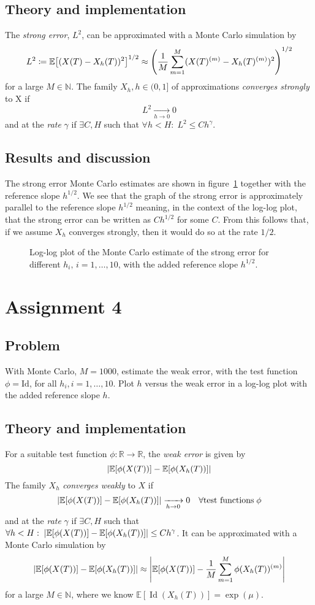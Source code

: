 \documentclass[11pt, a4paper]{article}
\let\originalleft\left
\let\originalright\right
\renewcommand{\left}{\mathopen{}\mathclose\bgroup\originalleft}
\renewcommand{\right}{\aftergroup\egroup\originalright}
\DeclareMathOperator{\Id}{Id}
\begin{document}
\subsection{Theory and implementation}
The \emph{strong error}, $L^2$, can be approximated with a Monte Carlo simulation by
$$ L^2 \coloneqq \mathbb E\left[(X(T) - X_h(T))^2\right]^{1/2}
	\approx \left(\frac1M \sum_{m=1}^M (X(T)^{(m)} - X_h(T)^{(m)})^2\right)^{1/2} $$
for a large $M \in \mathbb N$.
The family $X_h, h \in (0, 1]$ of approximations \emph{converges strongly} to X if
$$ L^2 \xrightarrow[h \to 0]{} 0 $$
and at the \emph{rate} $\gamma$
if $\exists C, H$ such that $\forall h < H: \; L^2 \le Ch^\gamma$.
\subsection{Results and discussion}
The strong error Monte Carlo estimates are shown in figure~\ref{fig:strong_error}
together with the reference slope $h^{1/2}$.
We see that the graph of the strong error is approximately parallel to the
reference slope $h^{1/2}$ meaning, in the context of the log-log plot,
that the strong error can be written as $Ch^{1/2}$ for some $C$.
From this follows that, if we assume $X_h$ converges strongly,
then it would do so at the rate $1/2$.

\begin{figure}
	\centering
	
	\caption{Log-log plot of the Monte Carlo estimate of the strong error for different $h_i, \, i = 1, \ldots, 10$,
	with the added reference slope $h^{1/2}$. \label{fig:strong_error}}
\end{figure}

\section{Assignment 4}
\subsection{Problem}
With Monte Carlo, $M = 1000$, estimate the weak error,
with the test function $\phi = \mathrm{Id}$,
for all $h_i, i = 1, \ldots, 10$.
Plot $h$ versus the weak error in a log-log plot with the added reference slope $h$.
\subsection{Theory and implementation}
For a suitable test function $\phi: \mathbb R \to \mathbb R$,
the \emph{weak error} is given by
\def\weakerror{\left|\mathbb E[\phi(X(T))] - \mathbb E[\phi(X_h(T))]\right|}
$$ \weakerror $$
The family $X_h$ \emph{converges weakly} to $X$ if
$$ \weakerror \xrightarrow[h \to 0]{} 0 \quad \forall \text{test functions} \; \phi $$
and at the \emph{rate} $\gamma$
if $\exists C, H$ such that $\forall h < H: \; \weakerror \le Ch^\gamma$.
It can be approximated with a Monte Carlo simulation by
$$ \weakerror \approx \left|\mathbb E[\phi(X(T))] - \frac1M \sum_{m=1}^M \phi(X_h(T))^{(m)}\right| $$
for a large $M \in \mathbb N$,
where we know $\mathbb E[\Id(X_h(T))] = \exp(\mu)$.
\end{document}
